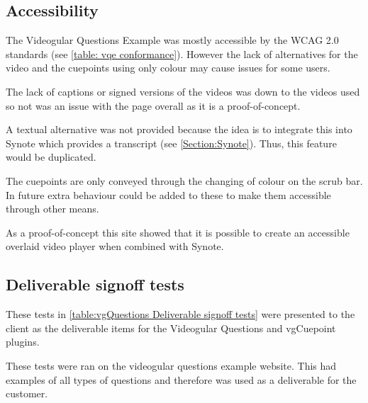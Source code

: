 \subsection{Accessibility}
\label{Subsection: vqe accessibility}

The \gls{Videogular} Questions Example was mostly accessible by the WCAG 2.0 standards (see \autoref{table: vqe conformance}). However the lack of alternatives for the video and the cuepoints using only colour may cause issues for some users.

The lack of captions or signed versions of the videos was down to the videos used so not was an issue with the page overall as it is a proof-of-concept.

A textual alternative was not provided because the idea is to integrate this into Synote which provides a transcript (see \autoref{Section:Synote}). Thus, this feature would be duplicated.

The cuepoints are only conveyed through the changing of colour on the scrub bar. In future extra behaviour could be added to these to make them accessible through other means.

As a proof-of-concept this site showed that it is possible to create an accessible overlaid video player when combined with Synote.

\subsection{Deliverable signoff tests}

These tests in \autoref{table:vgQuestions Deliverable signoff tests} were presented to the client as the deliverable items for the Videogular Questions and vgCuepoint plugins.

These tests were ran on the videogular questions example website. This had examples of all types of questions and therefore was used as a deliverable for the customer.

